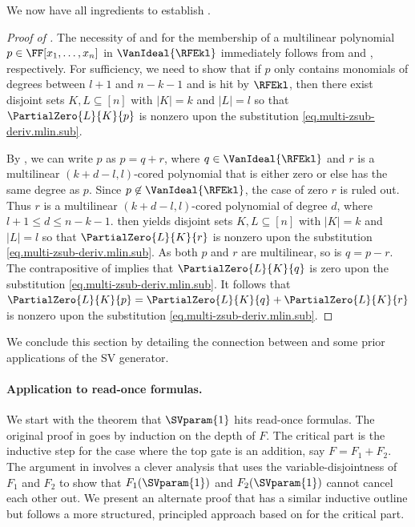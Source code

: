 We now have all ingredients to establish 
. 

\begin{proof}[Proof of ]
The necessity of  and  for the membership of a 
 multilinear polynomial $p \in \FF[x_1,\dots,x_n]$ in $\VanIdeal{\RFEkl}$ immediately follows from  and , respectively. For sufficiency, we need to show that if $p$ only contains monomials of degrees between $l+1$ and $n-k-1$ and is hit by $\RFEkl$, then there exist disjoint sets \(K,L\subseteq [n]\) with \(|K|=k\) and \(|L|=l\) so that \(\PartialZero{L}{K}{p}\) is nonzero upon the substitution \eqref{eq.multi-zsub-deriv.mlin.sub}.
 
 By , we can write $p$ as $p=q+r$, where $q \in \VanIdeal{\RFEkl}$ and $r$ is a multilinear \((k+d-l,l)\)-cored polynomial that is either zero or else has the same degree as $p$. Since $p \not\in \VanIdeal{\RFEkl}$, the case of zero $r$ is ruled out. Thus $r$ is a multilinear \((k+d-l,l)\)-cored polynomial of degree $d$, where $l+1 \le d \le n-k-1$.  then yields disjoint sets \(K,L\subseteq [n]\) with \(|K|=k\) and \(|L|=l\) so that \(\PartialZero{L}{K}{r}\) is nonzero upon the substitution \eqref{eq.multi-zsub-deriv.mlin.sub}. As both $p$ and $r$ are multilinear, so is $q = p-r$. The contrapositive of  implies that \(\PartialZero{L}{K}{q}\) is zero upon the substitution \eqref{eq.multi-zsub-deriv.mlin.sub}. It follows that \(\PartialZero{L}{K}{p} = \PartialZero{L}{K}{q} + \PartialZero{L}{K}{r}\) is nonzero upon the substitution \eqref{eq.multi-zsub-deriv.mlin.sub}.
\end{proof}


We conclude this section by detailing the connection between
 and some prior applications of the SV generator.

\paragraph{Application to read-once formulas.}
We start with the theorem that \(\SVparam{1}\) hits read-once formulas.
The original proof in \cite{MinahanVolkovich2017} goes by induction on the
depth of $F$. The critical part is the inductive step for the case where the top gate is an addition, say $F = F_1 + F_2$. The argument in \cite{MinahanVolkovich2017} involves a clever analysis that uses the variable-disjointness of $F_1$ and $F_2$ to show that $F_1(\SVparam{1})$ and $F_2(\SVparam{1})$ cannot cancel each other out. We present an alternate proof that has a similar inductive outline but follows a more structured, principled approach based on  for the critical part.

